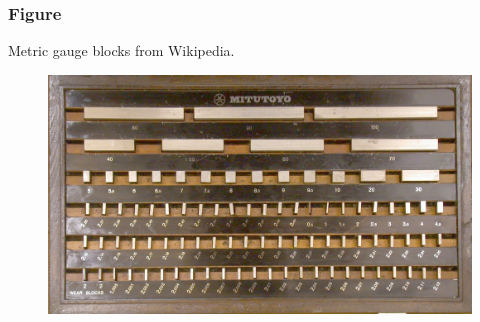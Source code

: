 \documentclass{beamer}
\begin{document}
\begin{frame}
\frametitle{Figure}
Metric gauge blocks from Wikipedia.
\begin{figure}
\includegraphics[width=0.8\linewidth]{Pictures/GaugeBlockMetricSet.jpg}
\end{figure}
\end{frame}

\end{document}
